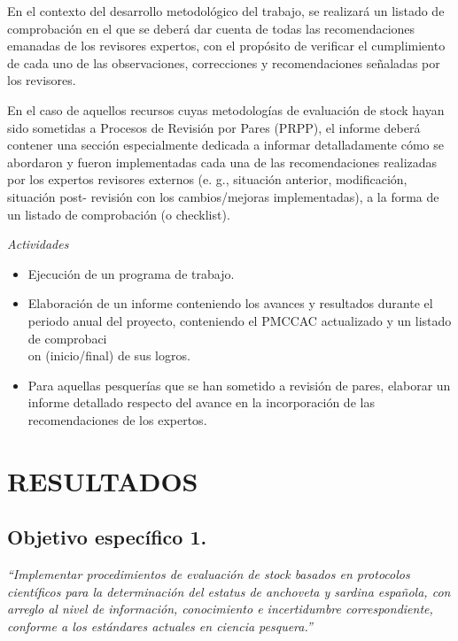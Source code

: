 \documentclass[letter,11pt]{article}
\begin{document}
En el contexto del desarrollo metodol\'ogico del trabajo, se realizar\'a un
listado de comprobaci\'on en el que se deber\'a dar cuenta de todas las
recomendaciones emanadas de los revisores expertos, con el prop\'osito de
verificar el cumplimiento de cada uno de las observaciones, correcciones
y recomendaciones se\~{n}aladas por los revisores.

En el caso de aquellos recursos cuyas metodolog\'ias de evaluaci\'on de
stock hayan sido sometidas a Procesos de Revisi\'on por Pares (PRPP), el
informe deber\'a contener una secci\'on especialmente dedicada a informar
detalladamente c\'omo se abordaron y fueron implementadas cada una de las
recomendaciones realizadas por los expertos revisores externos (e. g.,
situaci\'on anterior, modificaci\'on, situaci\'on post- revisi\'on con los
cambios/mejoras implementadas), a la forma de un listado de comprobaci\'on
(o checklist).

\emph{Actividades}

\begin{itemize}
\def\labelenumi{\roman{enumi})}
\item
  Ejecuci\'on de un programa de trabajo.
\item
  Elaboraci\'on de un informe conteniendo los avances y resultados durante
  el periodo anual del proyecto, conteniendo el PMCCAC actualizado y un
  listado de comprobaci\\on (inicio/final) de sus logros.
\item
  Para aquellas pesquer\'ias que se han sometido a revisi\'on de pares,
  elaborar un informe detallado respecto del avance en la incorporaci\'on
  de las recomendaciones de los expertos.
\end{itemize}


\clearpage
\newpage

\section{RESULTADOS}


\subsection{Objetivo espec\'ifico 1.}

\textit{\textquotedblleft Implementar procedimientos de evaluaci\'on de stock basados en protocolos cient\'ificos para la determinaci\'on del estatus de anchoveta y sardina espa\~{n}ola, con arreglo al nivel de informaci\'on, conocimiento e incertidumbre correspondiente, conforme a los est\'andares actuales en ciencia pesquera.\textquotedblright}
\vspace{0.5cm}
\end{document}
